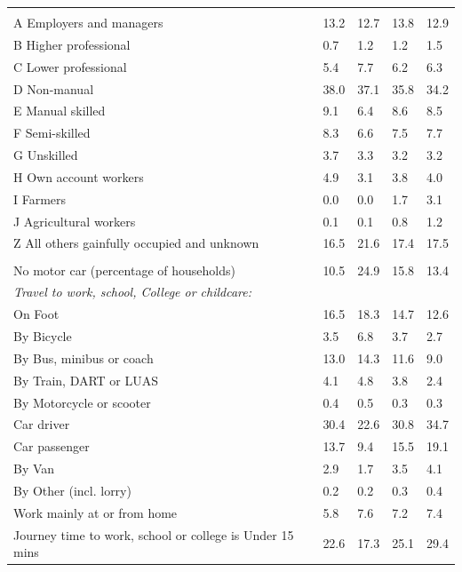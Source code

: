 \documentclass{article}
\begin{document}
\begin{table}[h]
\begin{tabular}{KTTTT}
\hline
    \\ 
    \hline
A Employers and managers & 13.2& 12.7& 13.8& 12.9\\
B Higher professional & 0.7& 1.2& 1.2& 1.5\\
C Lower professional & 5.4& 7.7& 6.2& 6.3\\
D Non-manual & 38.0& 37.1& 35.8& 34.2\\
E Manual skilled & 9.1& 6.4& 8.6& 8.5\\
F Semi-skilled & 8.3& 6.6& 7.5& 7.7\\
G Unskilled & 3.7& 3.3& 3.2& 3.2\\
H Own account workers & 4.9& 3.1& 3.8& 4.0\\
I Farmers & 0.0& 0.0& 1.7& 3.1\\
J Agricultural workers & 0.1& 0.1& 0.8& 1.2\\
Z All others gainfully occupied and unknown & 16.5& 21.6& 17.4& 17.5\\
\hline
{}\hline
    \\ 
    \hline
No motor car (percentage of households) & 10.5& 24.9& 15.8& 
13.4\\
    \hline 
\emph{Travel to work, school, College or childcare:} & & & \\
\quad On Foot & 16.5& 18.3& 14.7& 12.6\\ 
\quad By Bicycle & 3.5& 6.8& 3.7& 2.7\\ 
\quad By Bus, minibus or coach & 13.0& 14.3& 11.6&  9.0\\
\quad By Train, DART or LUAS & 4.1& 4.8& 3.8& 2.4\\
\quad By Motorcycle or scooter & 0.4& 0.5& 0.3& 0.3\\
\quad Car driver & 30.4 & 22.6& 30.8& 34.7\\
\quad Car passenger & 13.7&  9.4& 15.5& 19.1\\
\quad By Van & 2.9& 1.7& 3.5& 4.1\\
\quad By Other (incl. lorry) & 0.2& 0.2& 0.3& 0.4\\
    \hline
Work mainly at or from home & 5.8& 7.6& 7.2& 7.4\\
Journey time to work, school or college is Under 15 mins & 22.6& 17.3& 25.1& 29.4\\

\end{tabular}
\end{table}
\end{document}
